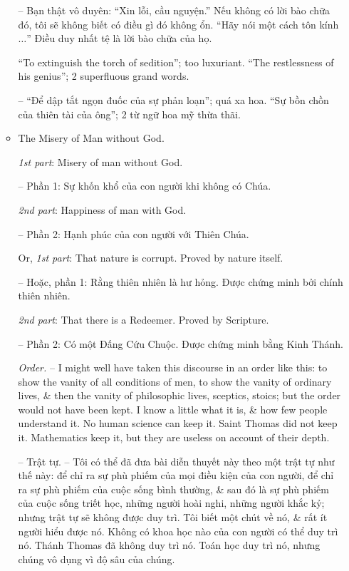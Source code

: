 \documentclass{article}
\begin{document}
\begin{enumerate}
\begin{itemize}
		-- Bạn thật vô duyên: ``Xin lỗi, cầu nguyện.'' Nếu không có lời bào chữa đó, tôi sẽ không biết có điều gì đó không ổn. ``Hãy nói một cách tôn kính $\ldots$'' Điều duy nhất tệ là lời bào chữa của họ.
		
		 ``To extinguish the torch of sedition''; too luxuriant. ``The restlessness of his genius''; 2 superfluous grand words.
		
		-- ``Để dập tắt ngọn đuốc của sự phản loạn''; quá xa hoa. ``Sự bồn chồn của thiên tài của ông''; 2 từ ngữ hoa mỹ thừa thãi.		
			 
		\item {\sf The Misery of Man without God.}
		
		 {\it1st part}: Misery of man without God.
		
		-- Phần 1: Sự khốn khổ của con người khi không có Chúa.
		
		{\it2nd part}: Happiness of man with God.
		
		-- Phần 2: Hạnh phúc của con người với Thiên Chúa.
		
		Or, {\it1st part}: That nature is corrupt. Proved by nature itself.
		
		-- Hoặc, phần 1: Rằng thiên nhiên là hư hỏng. Được chứng minh bởi chính thiên nhiên.
		
		{\it2nd part}: That there is a Redeemer. Proved by Scripture.
		
		-- Phần 2: Có một Đấng Cứu Chuộc. Được chứng minh bằng Kinh Thánh.
		
		 {\it Order.} -- I might well have taken this discourse in an order like this: to show the vanity of all conditions of men, to show the vanity of ordinary lives, \& then the vanity of philosophic lives, sceptics, stoics; but the order would not have been kept. I know a little what it is, \& how few people understand it. No human science can keep it. Saint Thomas did not keep it. Mathematics keep it, but they are useless on account of their depth.
		
		-- Trật tự. -- Tôi có thể đã đưa bài diễn thuyết này theo một trật tự như thế này: để chỉ ra sự phù phiếm của mọi điều kiện của con người, để chỉ ra sự phù phiếm của cuộc sống bình thường, \& sau đó là sự phù phiếm của cuộc sống triết học, những người hoài nghi, những người khắc kỷ; nhưng trật tự sẽ không được duy trì. Tôi biết một chút về nó, \& rất ít người hiểu được nó. Không có khoa học nào của con người có thể duy trì nó. Thánh Thomas đã không duy trì nó. Toán học duy trì nó, nhưng chúng vô dụng vì độ sâu của chúng.
		

\end{itemize}
\end{enumerate}
\end{document}
